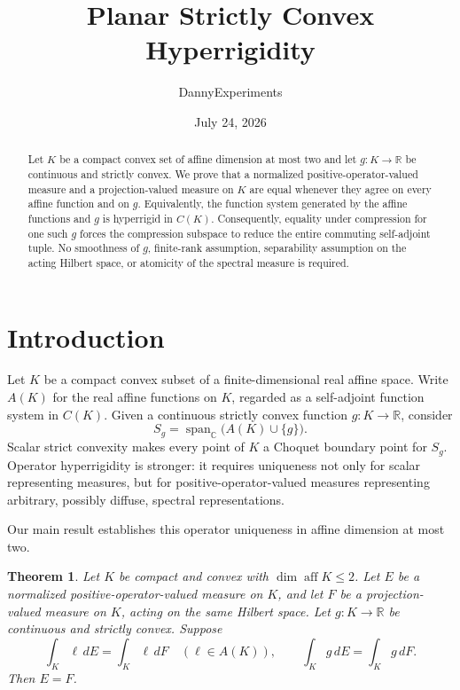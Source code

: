\documentclass[11pt,a4paper]{amsart}
\title{Planar Strictly Convex Hyperrigidity}
\author{DannyExperiments}
\date{July 24, 2026}
\newtheorem{theorem}{Theorem}[section]
\theoremstyle{remark}
\newcommand{\aff}{\operatorname{aff}}
\begin{document}
\begin{abstract}
Let \(K\) be a compact convex set of affine dimension at most two and let
\(g\colon K\to\mathbb R\) be continuous and strictly convex.
We prove that a normalized positive-operator-valued measure and a
projection-valued measure on \(K\) are equal whenever they agree on every
affine function and on \(g\).
Equivalently, the function system generated by the affine functions and
\(g\) is hyperrigid in \(C(K)\).
Consequently, equality under compression for one such \(g\) forces the
compression subspace to reduce the entire commuting self-adjoint tuple.
No smoothness of \(g\), finite-rank assumption, separability assumption on
the acting Hilbert space, or atomicity of the spectral measure is required.
\end{abstract}

\maketitle

\section{Introduction}

Let \(K\) be a compact convex subset of a finite-dimensional real affine
space.  Write \(A(K)\) for the real affine functions on \(K\), regarded as a
self-adjoint function system in \(C(K)\).  Given a continuous strictly convex
function \(g\colon K\to\mathbb R\), consider
\[
   S_g=\operatorname{span}_{\mathbb C}\bigl(A(K)\cup\{g\}\bigr).
\]
Scalar strict convexity makes every point of \(K\) a Choquet boundary point
for \(S_g\).  Operator hyperrigidity is stronger: it requires uniqueness not
only for scalar representing measures, but for positive-operator-valued
measures representing arbitrary, possibly diffuse, spectral
representations.

Our main result establishes this operator uniqueness in affine dimension at
most two.

\begin{theorem}\label{thm:main}
Let \(K\) be compact and convex with \(\dim\aff K\leq 2\).  Let \(E\) be a
normalized positive-operator-valued measure on \(K\), and let \(F\) be a
projection-valued measure on \(K\), acting on the same Hilbert space.  Let
\(g\colon K\to\mathbb R\) be continuous and strictly convex.  Suppose
\[
 \int_K\ell\,dE=\int_K\ell\,dF\quad(\ell\in A(K)),
 \qquad
 \int_Kg\,dE=\int_Kg\,dF.
\]
Then \(E=F\).
\end{theorem}
\end{document}
